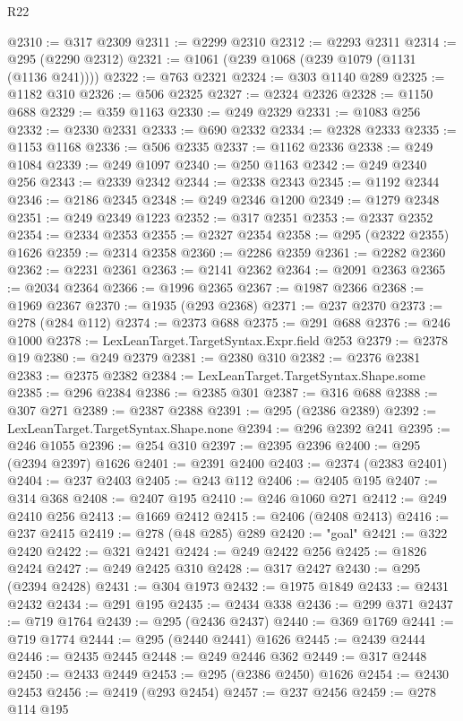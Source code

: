 \begin{lexlean}{R22}
\begin{coremodule}
@2310 := @317 @2309
@2311 := @2299 @2310
@2312 := @2293 @2311
@2314 := @295 (@2290 @2312)
@2321 := @1061 (@239 @1068 (@239 @1079 (@1131 (@1136 @241))))
@2322 := @763 @2321
@2324 := @303 @1140 @289
@2325 := @1182 @310
@2326 := @506 @2325
@2327 := @2324 @2326
@2328 := @1150 @688
@2329 := @359 @1163
@2330 := @249 @2329
@2331 := @1083 @256
@2332 := @2330 @2331
@2333 := @690 @2332
@2334 := @2328 @2333
@2335 := @1153 @1168
@2336 := @506 @2335
@2337 := @1162 @2336
@2338 := @249 @1084
@2339 := @249 @1097
@2340 := @250 @1163
@2342 := @249 @2340 @256
@2343 := @2339 @2342
@2344 := @2338 @2343
@2345 := @1192 @2344
@2346 := @2186 @2345
@2348 := @249 @2346 @1200
@2349 := @1279 @2348
@2351 := @249 @2349 @1223
@2352 := @317 @2351
@2353 := @2337 @2352
@2354 := @2334 @2353
@2355 := @2327 @2354
@2358 := @295 (@2322 @2355) @1626
@2359 := @2314 @2358
@2360 := @2286 @2359
@2361 := @2282 @2360
@2362 := @2231 @2361
@2363 := @2141 @2362
@2364 := @2091 @2363
@2365 := @2034 @2364
@2366 := @1996 @2365
@2367 := @1987 @2366
@2368 := @1969 @2367
@2370 := @1935 (@293 @2368)
@2371 := @237 @2370
@2373 := @278 (@284 @112)
@2374 := @2373 @688
@2375 := @291 @688
@2376 := @246 @1000
@2378 := LexLeanTarget.TargetSyntax.Expr.field @253
@2379 := @2378 @19
@2380 := @249 @2379
@2381 := @2380 @310
@2382 := @2376 @2381
@2383 := @2375 @2382
@2384 := LexLeanTarget.TargetSyntax.Shape.some
@2385 := @296 @2384
@2386 := @2385 @301
@2387 := @316 @688
@2388 := @307 @271
@2389 := @2387 @2388
@2391 := @295 (@2386 @2389)
@2392 := LexLeanTarget.TargetSyntax.Shape.none
@2394 := @296 @2392 @241
@2395 := @246 @1055
@2396 := @254 @310
@2397 := @2395 @2396
@2400 := @295 (@2394 @2397) @1626
@2401 := @2391 @2400
@2403 := @2374 (@2383 @2401)
@2404 := @237 @2403
@2405 := @243 @112
@2406 := @2405 @195
@2407 := @314 @368
@2408 := @2407 @195
@2410 := @246 @1060 @271
@2412 := @249 @2410 @256
@2413 := @1669 @2412
@2415 := @2406 (@2408 @2413)
@2416 := @237 @2415
@2419 := @278 (@48 @285) @289
@2420 := "goal"
@2421 := @322 @2420
@2422 := @321 @2421
@2424 := @249 @2422 @256
@2425 := @1826 @2424
@2427 := @249 @2425 @310
@2428 := @317 @2427
@2430 := @295 (@2394 @2428)
@2431 := @304 @1973
@2432 := @1975 @1849
@2433 := @2431 @2432
@2434 := @291 @195
@2435 := @2434 @338
@2436 := @299 @371
@2437 := @719 @1764
@2439 := @295 (@2436 @2437)
@2440 := @369 @1769
@2441 := @719 @1774
@2444 := @295 (@2440 @2441) @1626
@2445 := @2439 @2444
@2446 := @2435 @2445
@2448 := @249 @2446 @362
@2449 := @317 @2448
@2450 := @2433 @2449
@2453 := @295 (@2386 @2450) @1626
@2454 := @2430 @2453
@2456 := @2419 (@293 @2454)
@2457 := @237 @2456
@2459 := @278 @114 @195

\end{coremodule}
\end{lexlean}
